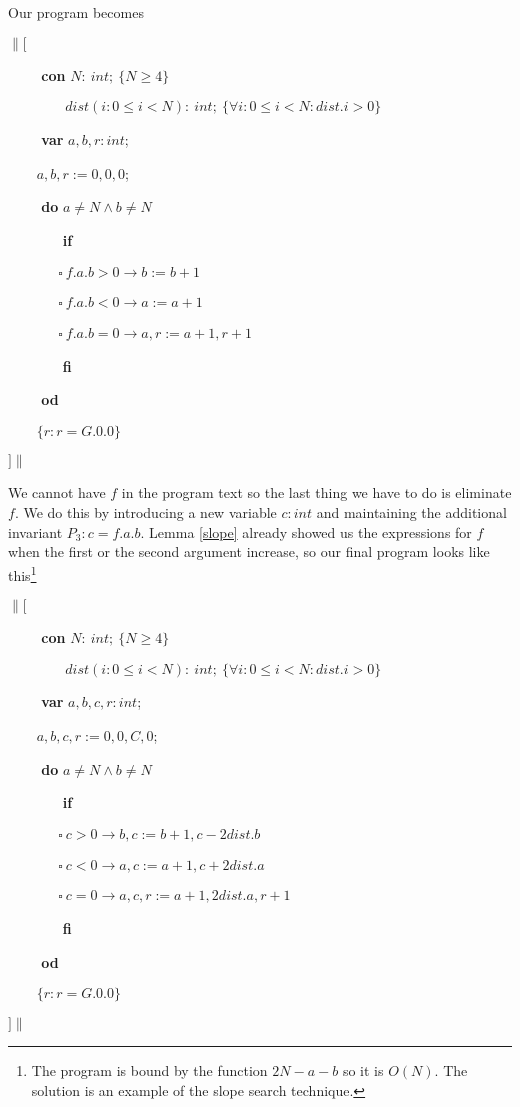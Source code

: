 Our program becomes\medskip

$\|[$

\verb|    | \textbf{con} $N:\ int;\ \{N \geq 4\}$

\verb|        | $dist(i: 0 \leq i < N):\ int;\ \{\forall i: 0 \leq i < N: dist.i > 0\}$

\verb|    | \textbf{var} $a, b, r: int$;

\verb|    | $a, b, r := 0, 0, 0$;

\verb|    | \textbf{do} $a \neq N \wedge b \neq N$

\verb|       | \textbf{if}

\verb|       | $\square\  f.a.b > 0 \rightarrow b := b + 1$

\verb|       |  $\square\  f.a.b < 0 \rightarrow a := a + 1$ 

\verb|       |  $\square\  f.a.b = 0 \rightarrow a, r := a + 1, r + 1$ 

\verb|       | \textbf{fi}

\verb|    | \textbf{od}

\verb|    | $\{r: r = G.0.0 \}$

$]\|$

\medskip

\noindent We cannot have $f$ in the program text so the last thing we have to do is eliminate $f$. We do this by introducing a new variable $c: int$ and maintaining the additional invariant $P_3: c = f.a.b$. Lemma \ref{slope} already showed us the expressions for $f$ when the first or the second argument increase, so our final program looks like this\footnote{The program is bound by the function $2 N - a - b$ so it is $O(N)$. The solution is an example of the slope search technique.}\medskip

$\|[$

\verb|    | \textbf{con} $N:\ int;\ \{N \geq 4\}$

\verb|        | $dist(i: 0 \leq i < N):\ int;\ \{\forall i: 0 \leq i < N: dist.i > 0\}$

\verb|    | \textbf{var} $a, b, c, r: int$;

\verb|    | $a, b, c, r := 0, 0, C, 0$;

\verb|    | \textbf{do} $a \neq N \wedge b \neq N$

\verb|       | \textbf{if}

\verb|       | $\square\  c > 0 \rightarrow b, c := b + 1, c - 2 dist.b$

\verb|       |  $\square\  c < 0 \rightarrow a, c := a + 1, c + 2 dist.a$ 

\verb|       |  $\square\  c = 0 \rightarrow a, c, r := a + 1, 2 dist.a, r + 1$ 

\verb|       | \textbf{fi}

\verb|    | \textbf{od}

\verb|    | $\{r: r = G.0.0 \}$

$]\|$
